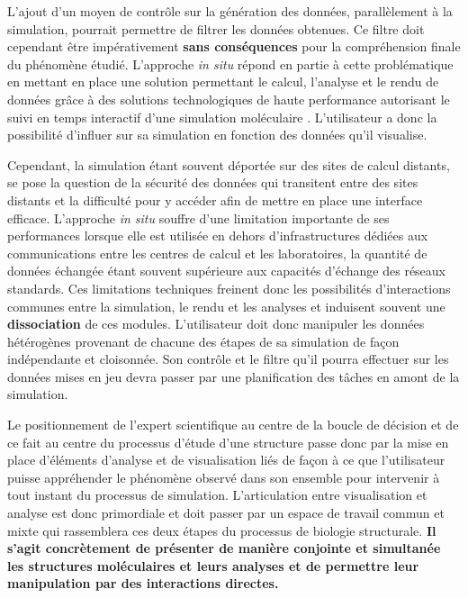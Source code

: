 L'ajout d'un moyen de contrôle sur la génération des données, parallèlement à la simulation, pourrait permettre de filtrer les données obtenues. Ce filtre doit cependant être impérativement \textbf{sans conséquences} pour la compréhension finale du phénomène étudié. L'approche \textit{in situ} répond en partie à cette problématique en mettant en place une solution permettant le calcul, l'analyse et le rendu de données grâce à des solutions technologiques de haute performance autorisant le suivi en temps interactif d'une simulation moléculaire \cite{dreher_interactive_2013,kuhlen2011parallel,ma2009situ}. L'utilisateur a donc la possibilité d'influer sur sa simulation en fonction des données qu'il visualise.

Cependant, la simulation étant souvent déportée sur des sites de calcul distants, se pose la question de la sécurité des données qui transitent entre des sites distants et la difficulté pour y accéder afin de mettre en place une interface efficace. L'approche \textit{in situ} souffre d'une limitation importante de ses performances lorsque elle est utilisée en dehors d'infrastructures dédiées aux communications entre les centres de calcul et les laboratoires, la quantité de données échangée étant souvent supérieure aux capacités d'échange des réseaux standards. Ces limitations techniques freinent donc les possibilités d'interactions communes entre la simulation, le rendu et les analyses et induisent souvent une \textbf{dissociation} de ces modules. L'utilisateur doit donc manipuler les données hétérogènes provenant de chacune des étapes de sa simulation de façon indépendante et cloisonnée. Son contrôle et le filtre qu'il pourra effectuer sur les données mises en jeu devra passer par une planification des tâches en amont de la simulation.

Le positionnement de l'expert scientifique au centre de la boucle de décision et de ce fait au centre du processus d'étude d'une structure passe donc par la mise en place d'éléments d'analyse et de visualisation liés de façon à ce que l'utilisateur puisse appréhender le phénomène observé dans son ensemble pour intervenir à tout instant du processus de simulation. 
L'articulation entre visualisation et analyse est donc primordiale et doit passer par un espace de travail commun et mixte qui rassemblera ces deux étapes du processus de biologie structurale. \textbf{Il s’agit concrètement de présenter de manière conjointe et simultanée les structures moléculaires et leurs analyses et de permettre leur manipulation par des interactions directes.}

